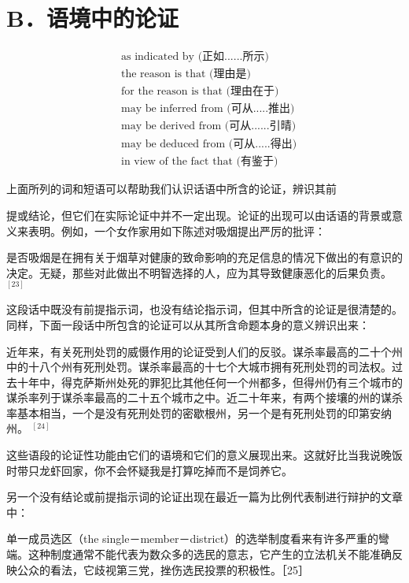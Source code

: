 \section*{B．语境中的论证}
$$
\begin{aligned}
& \text { as indicated by (正如......所示) } \\
& \text { the reason is that (理由是) } \\
& \text { for the reason is that (理由在于) } \\
& \text { may be inferred from (可从.....推出) } \\
& \text { may be derived from (可从......引晴) } \\
& \text { may be deduced from (可从.....得出) } \\
& \text { in view of the fact that (有鉴于) }
\end{aligned}
$$

上面所列的词和短语可以帮助我们认识话语中所含的论证，辨识其前

提或结论，但它们在实际论证中并不一定出现。论证的出现可以由话语的背景或意义来表明。例如，一个女作家用如下陈述对吸烟提出严厉的批评：

是否吸烟是在拥有关于烟草对健康的致命影响的充足信息的情况下做出的有意识的决定。无疑，那些对此做出不明智选择的人，应为其导致健康恶化的后果负责。 ${ }^{[23]}$

这段话中既没有前提指示词，也没有结论指示词，但其中所含的论证是很清楚的。同样，下面一段话中所包含的论证可以从其所含命题本身的意义辨识出来：

\begin{displayquote}
近年来，有关死刑处罚的威慑作用的论证受到人们的反驳。谋杀率最高的二十个州中的十八个州有死刑处罚。谋杀率最高的十七个大城市拥有死刑处罚的司法权。过去十年中，得克萨斯州处死的罪犯比其他任何一个州都多，但得州仍有三个城市的谋杀率列于谋杀率最高的二十五个城市之中。近二十年来，有两个接壤的州的谋杀率基本相当，一个是没有死刑处罚的密歇根州，另一个是有死刑处罚的印第安纳州。 ${ }^{[24]}$
\end{displayquote}

这些语段的论证性功能由它们的语境和它们的意义展现出来。这就好比当我说晚饭时带只龙虾回家，你不会怀疑我是打算吃掉而不是饲养它。

另一个没有结论或前提指示词的论证出现在最近一篇为比例代表制进行辩护的文章中：

单一成员选区（the single－member－district）的选举制度看来有许多严重的彎端。这种制度通常不能代表为数众多的选民的意志，它产生的立法机关不能准确反映公众的看法，它歧视第三党，挫伤选民投票的积极性。［25］

